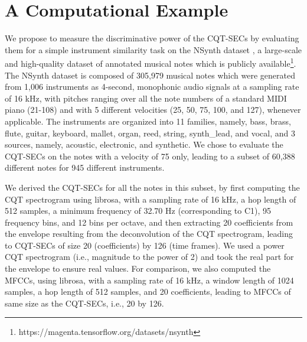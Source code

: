 \documentclass[journal]{IEEEtran}
\begin{document}
\section{A Computational Example}

We propose to measure the discriminative power of the CQT-SECs by evaluating them for a simple instrument similarity task on the NSynth dataset \cite{engel2017}, a large-scale and high-quality dataset of annotated musical notes which is publicly available\footnote{https://magenta.tensorflow.org/datasets/nsynth}. The NSynth dataset is composed of 305,979 musical notes which were generated from 1,006 instruments as 4-second, monophonic audio signals at a sampling rate of 16 kHz, with pitches ranging over all the note numbers of a standard MIDI piano (21-108) and with 5 different velocities (25, 50, 75, 100, and 127), whenever applicable. The instruments are organized into 11 families, namely, bass, brass, flute, guitar, keyboard, mallet, organ, reed, string, synth\_lead, and vocal, and 3 sources, namely, acoustic, electronic, and synthetic. We chose to evaluate the CQT-SECs on the notes with a velocity of 75 only, leading to a subset of 60,388 different notes for 945 different instruments.

We derived the CQT-SECs for all the notes in this subset, by first computing the CQT spectrogram using librosa, with a sampling rate of 16 kHz, a hop length of 512 samples, a minimum frequency of 32.70 Hz (corresponding to C1), 95 frequency bins, and 12 bins per octave, and then extracting 20 coefficients from the envelope resulting from the deconvolution of the CQT spectrogram, leading to CQT-SECs of size 20 (coefficients) by 126 (time frames). We used a power CQT spectrogram (i.e., magnitude to the power of 2) and took the real part for the envelope to ensure real values. For comparison, we also computed the MFCCs, using librosa, with a sampling rate of 16 kHz, a window length of 1024 samples, a hop length of 512 samples, and 20 coefficients, leading to MFCCs of same size as the CQT-SECs, i.e., 20 by 126.
\end{document}
